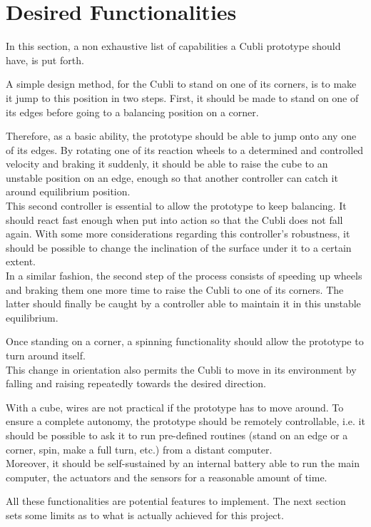 \section{Desired Functionalities}\label{sec:mainFunctionalities}
In this section, a non exhaustive list of capabilities a Cubli prototype should have, is put forth.

A simple design method, for the Cubli to stand on one of its corners, is to make it jump to this position in two steps. First, it should be made to stand on one of its edges before going to a balancing position on a corner.

Therefore, as a basic ability, the prototype should be able to jump onto any one of its edges.
By rotating one of its reaction wheels to a determined and controlled velocity and braking it suddenly, it should be able to raise the cube to an unstable position on an edge, enough so that another controller can catch it around equilibrium position.\\
This second controller is essential to allow the prototype to keep balancing. It should react fast enough when put into action so that the Cubli does not fall again. With some more considerations regarding this controller's robustness, it should be possible to change the inclination of the surface under it to a certain extent.\\
In a similar fashion, the second step of the process consists of speeding up wheels and braking them one more time to raise the Cubli to one of its corners. The latter should finally be caught by a controller able to maintain it in this unstable equilibrium.

Once standing on a corner, a spinning functionality should allow the prototype to turn around itself.\\
This change in orientation also permits the Cubli to move in its environment by falling and raising repeatedly towards the desired direction.

With a cube, wires are not practical if the prototype has to move around. To ensure a complete autonomy, the prototype should be remotely controllable, i.e. it should be possible to ask it to run pre-defined routines (stand on an edge or a corner, spin, make a full turn, etc.) from a distant computer.\\
Moreover, it should be self-sustained by an internal battery able to run the main computer, the actuators and the sensors for a reasonable amount of time.

All these functionalities are potential features to implement. The next section sets some limits as to what is actually achieved for this project.
